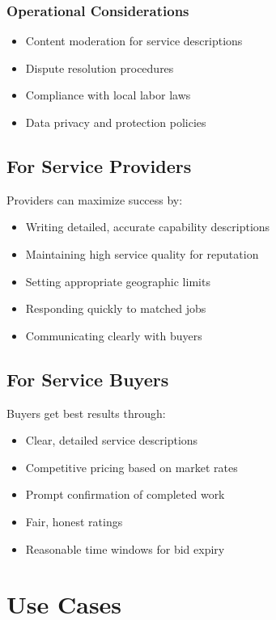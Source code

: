 \documentclass[11pt,a4paper]{article}
\begin{document}
\subsubsection{Operational Considerations}
\begin{itemize}
    \item Content moderation for service descriptions
    \item Dispute resolution procedures
    \item Compliance with local labor laws
    \item Data privacy and protection policies
\end{itemize}

\subsection{For Service Providers}

Providers can maximize success by:

\begin{itemize}
    \item Writing detailed, accurate capability descriptions
    \item Maintaining high service quality for reputation
    \item Setting appropriate geographic limits
    \item Responding quickly to matched jobs
    \item Communicating clearly with buyers
\end{itemize}

\subsection{For Service Buyers}

Buyers get best results through:

\begin{itemize}
    \item Clear, detailed service descriptions
    \item Competitive pricing based on market rates
    \item Prompt confirmation of completed work
    \item Fair, honest ratings
    \item Reasonable time windows for bid expiry
\end{itemize}

\section{Use Cases}
\end{document}
